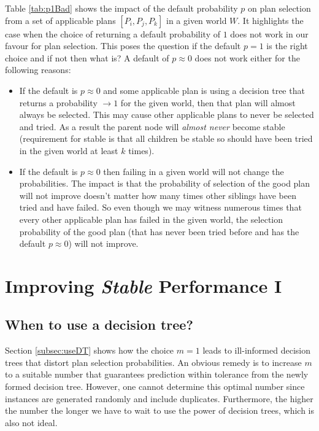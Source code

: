 \documentclass[a4paper]{article}
\newcommand{\dt}{{decision tree}\xspace}
\begin{document}
Table \ref{tab:p1Bad} shows the impact of the default probability $p$ on plan selection from a set of applicable plans $[P_i,P_j,P_k]$ in a given world $W$. It highlights the case when the choice of returning a default probability of $1$ does not work in our favour for plan selection. This poses the question if the default $p=1$ is the right choice and if not then what is? A default of $p\approx0$ does not work either for the following reasons:
\begin{itemize}
\item If the default is $p\approx0$ and some applicable plan is using a \dt that returns a probability $\to 1$ for the given world, then that plan will almost always be selected. This may cause other applicable plans to never be selected and tried. As a result the parent node will \emph{almost never} become stable (requirement for stable is that all children be stable so should have been tried in the given world at least $k$ times).
\item If the default is $p\approx0$ then failing in a given world will not change the probabilities. The impact is that the probability of selection of the good plan will not improve doesn't matter how many times other siblings have been tried and have failed. So even though we may witness numerous times that every other applicable plan has failed in the given world, the selection probability of the good plan (that has never been tried before and has the default $p\approx0$) will not improve.
\end{itemize}


\section{Improving \textit{Stable} Performance I}

\subsection{When to use a \dt?}
\label{sec:deciding-when-to-use}

Section \ref{subsec:useDT} shows how the choice $m=1$ leads to ill-informed {\dt}s that distort plan selection probabilities. An obvious remedy is to increase $m$ to a suitable number that guarantees prediction within tolerance from the newly formed 
\dt. However, one cannot determine this optimal number since instances are generated randomly and include duplicates. Furthermore, the higher the number the longer we have to wait to use the power of {\dt}s, which is also not ideal.
\end{document}
